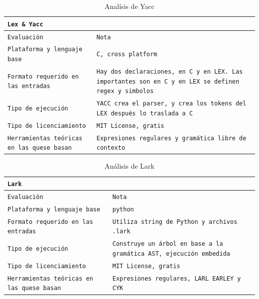 \documentclass[12pt, letterpaper]{article}
\theoremstyle{definition}
\begin{document}
\begin{center}
\begin{longtable}{|p{3.5cm}|p{11cm}|}
    \caption{Analísis de Yacc} \\
    \hline
    \multicolumn{2}{|l|}{    \texttt{Lex \& Yacc}     } \\
    \hline
    \texttt{Evaluación} & \texttt{Nota} \\
    \hline
    \endfirsthead
    \hline
    \endfoot
    \hline
    \endlastfoot
    \hline
    \texttt{Plataforma y lenguaje base}      & \texttt{C, cross platform}   \\ \hline
    \texttt{Formato requerido en las entradas}   & \texttt{Hay dos declaraciones, en C y en LEX. Las importantes son en C y en LEX se definen regex y simbolos}                  \\ \hline
    \texttt{Tipo de ejecución}   & \texttt{YACC crea el parser, y crea los tokens del LEX después lo traslada a C} \\ \hline
    \texttt{Tipo de licenciamiento}   & \texttt{MIT License, gratis} \\ \hline
    \texttt{Herramientas teóricas en las quese basan}   & \texttt{Expresiones regulares y gramática libre de contexto} \\ \hline

\end{longtable}
\end{center}

\begin{center}
\begin{longtable}{|p{3.5cm}|p{11cm}|}
    \caption{Análisis de Lark} \\
    \hline
    \multicolumn{2}{|l|}{    \texttt{Lark}     } \\
    \hline
    \texttt{Evaluación} & \texttt{Nota} \\
    \hline
    \endfirsthead
    \hline
    \endfoot
    \hline
    \endlastfoot
    \hline
    \texttt{Plataforma y lenguaje base}      & \texttt{python}   \\ \hline
    \texttt{Formato requerido en las entradas}   & \texttt{Utiliza string de Python y archivos .lark}  \\ \hline
    \texttt{Tipo de ejecución}   & \texttt{Construye un árbol en base a la gramática AST, ejecución embedida} \\ \hline
    \texttt{Tipo de licenciamiento}   & \texttt{MIT License, gratis} \\ \hline
    \texttt{Herramientas teóricas en las quese basan}   & \texttt{Expresiones regulares, LARL EARLEY y CYK} \\ \hline
\end{longtable}
\end{center}
\end{document}
